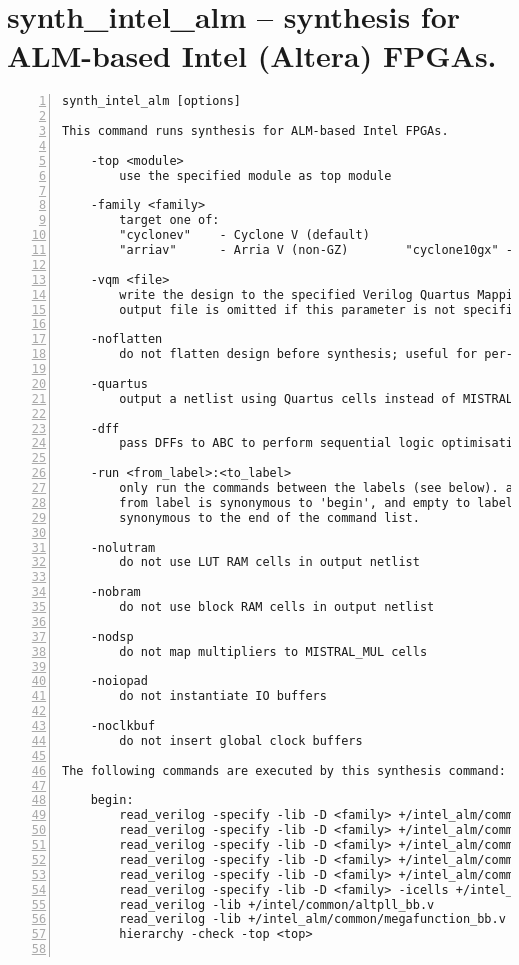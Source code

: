 \section{synth\_intel\_alm -- synthesis for ALM-based Intel (Altera) FPGAs.}
\label{cmd:synth_intel_alm}
\begin{lstlisting}[numbers=left,frame=single]
    synth_intel_alm [options]

This command runs synthesis for ALM-based Intel FPGAs.

    -top <module>
        use the specified module as top module

    -family <family>
        target one of:
        "cyclonev"    - Cyclone V (default)
        "arriav"      - Arria V (non-GZ)        "cyclone10gx" - Cyclone 10GX

    -vqm <file>
        write the design to the specified Verilog Quartus Mapping File. Writing of an
        output file is omitted if this parameter is not specified. Implies -quartus.

    -noflatten
        do not flatten design before synthesis; useful for per-module area statistics

    -quartus
        output a netlist using Quartus cells instead of MISTRAL_* cells

    -dff
        pass DFFs to ABC to perform sequential logic optimisations (EXPERIMENTAL)

    -run <from_label>:<to_label>
        only run the commands between the labels (see below). an empty
        from label is synonymous to 'begin', and empty to label is
        synonymous to the end of the command list.

    -nolutram
        do not use LUT RAM cells in output netlist

    -nobram
        do not use block RAM cells in output netlist

    -nodsp
        do not map multipliers to MISTRAL_MUL cells

    -noiopad
        do not instantiate IO buffers

    -noclkbuf
        do not insert global clock buffers

The following commands are executed by this synthesis command:

    begin:
        read_verilog -specify -lib -D <family> +/intel_alm/common/alm_sim.v
        read_verilog -specify -lib -D <family> +/intel_alm/common/dff_sim.v
        read_verilog -specify -lib -D <family> +/intel_alm/common/dsp_sim.v
        read_verilog -specify -lib -D <family> +/intel_alm/common/mem_sim.v
        read_verilog -specify -lib -D <family> +/intel_alm/common/misc_sim.v
        read_verilog -specify -lib -D <family> -icells +/intel_alm/common/abc9_model.v
        read_verilog -lib +/intel/common/altpll_bb.v
        read_verilog -lib +/intel_alm/common/megafunction_bb.v
        hierarchy -check -top <top>


\end{lstlisting}
